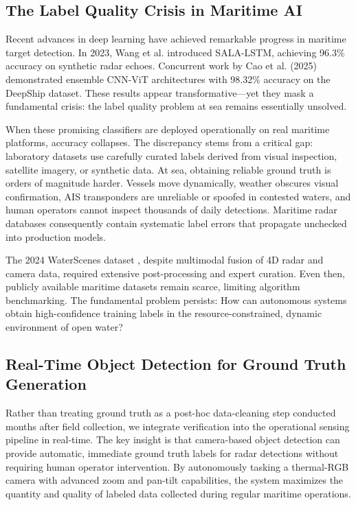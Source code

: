 \documentclass[conf]{asmeconf}
\begin{document}
\subsection{The Label Quality Crisis in Maritime AI}

Recent advances in deep learning have achieved remarkable progress in maritime target detection. In 2023, Wang et al. \cite{Wang2023SALALSTM} introduced SALA-LSTM, achieving 96.3\% accuracy on synthetic radar echoes. Concurrent work by Cao et al. (2025) \cite{Cao2025VesselCNN} demonstrated ensemble CNN-ViT architectures with 98.32\% accuracy on the DeepShip dataset. These results appear transformative---yet they mask a fundamental crisis: the label quality problem at sea remains essentially unsolved.

When these promising classifiers are deployed operationally on real maritime platforms, accuracy collapses. The discrepancy stems from a critical gap: laboratory datasets use carefully curated labels derived from visual inspection, satellite imagery, or synthetic data. At sea, obtaining reliable ground truth is orders of magnitude harder. Vessels move dynamically, weather obscures visual confirmation, AIS transponders are unreliable or spoofed in contested waters, and human operators cannot inspect thousands of daily detections. Maritime radar databases consequently contain systematic label errors that propagate unchecked into production models.

The 2024 WaterScenes dataset \cite{Zhang2024WaterScenes}, despite multimodal fusion of 4D radar and camera data, required extensive post-processing and expert curation. Even then, publicly available maritime datasets remain scarce, limiting algorithm benchmarking. The fundamental problem persists: How can autonomous systems obtain high-confidence training labels in the resource-constrained, dynamic environment of open water?

\subsection{Real-Time Object Detection for Ground Truth Generation}

Rather than treating ground truth as a post-hoc data-cleaning step conducted months after field collection, we integrate verification into the operational sensing pipeline in real-time. The key insight is that camera-based object detection can provide automatic, immediate ground truth labels for radar detections without requiring human operator intervention. By autonomously tasking a thermal-RGB camera with advanced zoom and pan-tilt capabilities, the system maximizes the quantity and quality of labeled data collected during regular maritime operations.
\end{document}
